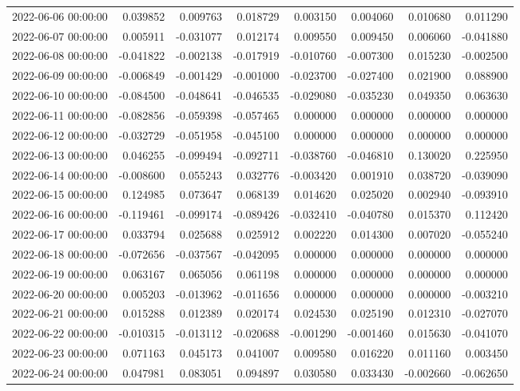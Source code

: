 \begin{tabular}{lrrrrrrr}
2022-06-06 00:00:00 & 0.039852 & 0.009763 & 0.018729 & 0.003150 & 0.004060 & 0.010680 & 0.011290 \\
2022-06-07 00:00:00 & 0.005911 & -0.031077 & 0.012174 & 0.009550 & 0.009450 & 0.006060 & -0.041880 \\
2022-06-08 00:00:00 & -0.041822 & -0.002138 & -0.017919 & -0.010760 & -0.007300 & 0.015230 & -0.002500 \\
2022-06-09 00:00:00 & -0.006849 & -0.001429 & -0.001000 & -0.023700 & -0.027400 & 0.021900 & 0.088900 \\
2022-06-10 00:00:00 & -0.084500 & -0.048641 & -0.046535 & -0.029080 & -0.035230 & 0.049350 & 0.063630 \\
2022-06-11 00:00:00 & -0.082856 & -0.059398 & -0.057465 & 0.000000 & 0.000000 & 0.000000 & 0.000000 \\
2022-06-12 00:00:00 & -0.032729 & -0.051958 & -0.045100 & 0.000000 & 0.000000 & 0.000000 & 0.000000 \\
2022-06-13 00:00:00 & 0.046255 & -0.099494 & -0.092711 & -0.038760 & -0.046810 & 0.130020 & 0.225950 \\
2022-06-14 00:00:00 & -0.008600 & 0.055243 & 0.032776 & -0.003420 & 0.001910 & 0.038720 & -0.039090 \\
2022-06-15 00:00:00 & 0.124985 & 0.073647 & 0.068139 & 0.014620 & 0.025020 & 0.002940 & -0.093910 \\
2022-06-16 00:00:00 & -0.119461 & -0.099174 & -0.089426 & -0.032410 & -0.040780 & 0.015370 & 0.112420 \\
2022-06-17 00:00:00 & 0.033794 & 0.025688 & 0.025912 & 0.002220 & 0.014300 & 0.007020 & -0.055240 \\
2022-06-18 00:00:00 & -0.072656 & -0.037567 & -0.042095 & 0.000000 & 0.000000 & 0.000000 & 0.000000 \\
2022-06-19 00:00:00 & 0.063167 & 0.065056 & 0.061198 & 0.000000 & 0.000000 & 0.000000 & 0.000000 \\
2022-06-20 00:00:00 & 0.005203 & -0.013962 & -0.011656 & 0.000000 & 0.000000 & 0.000000 & -0.003210 \\
2022-06-21 00:00:00 & 0.015288 & 0.012389 & 0.020174 & 0.024530 & 0.025190 & 0.012310 & -0.027070 \\
2022-06-22 00:00:00 & -0.010315 & -0.013112 & -0.020688 & -0.001290 & -0.001460 & 0.015630 & -0.041070 \\
2022-06-23 00:00:00 & 0.071163 & 0.045173 & 0.041007 & 0.009580 & 0.016220 & 0.011160 & 0.003450 \\
2022-06-24 00:00:00 & 0.047981 & 0.083051 & 0.094897 & 0.030580 & 0.033430 & -0.002660 & -0.062650 \\

\end{tabular}
